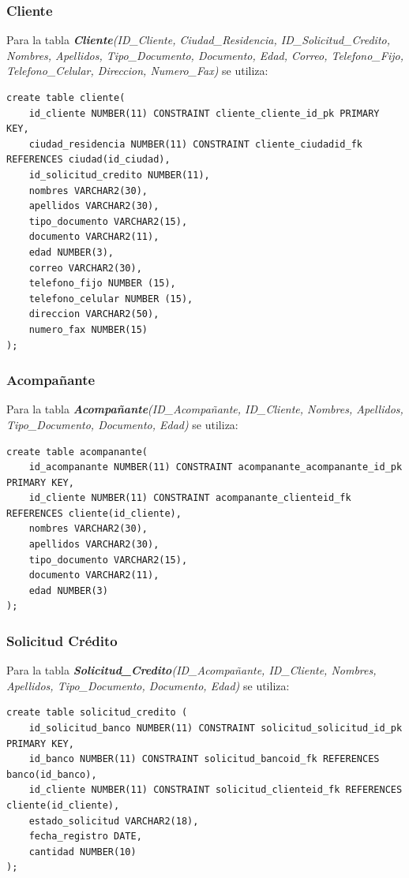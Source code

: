 \documentclass{article}
\begin{document}
\subsubsection{Cliente}

Para la tabla \textit{\textbf{Cliente}(ID\_Cliente, Ciudad\_Residencia, ID\_Solicitud\_Credito, Nombres, Apellidos, Tipo\_Documento, Documento, Edad, Correo, Telefono\_Fijo, Telefono\_Celular, Direccion, Numero\_Fax)} se utiliza:

\begin{lstlisting}
create table cliente(
    id_cliente NUMBER(11) CONSTRAINT cliente_cliente_id_pk PRIMARY KEY,
    ciudad_residencia NUMBER(11) CONSTRAINT cliente_ciudadid_fk REFERENCES ciudad(id_ciudad),
    id_solicitud_credito NUMBER(11),
    nombres VARCHAR2(30),
    apellidos VARCHAR2(30),
    tipo_documento VARCHAR2(15),
    documento VARCHAR2(11),
    edad NUMBER(3),
    correo VARCHAR2(30),
    telefono_fijo NUMBER (15),
    telefono_celular NUMBER (15),
    direccion VARCHAR2(50),
    numero_fax NUMBER(15)
);
\end{lstlisting}

\subsubsection{Acompañante}

Para la tabla \textit{\textbf{Acompañante}(ID\_Acompañante, ID\_Cliente, Nombres, Apellidos, Tipo\_Documento, Documento, Edad)} se utiliza:

\begin{lstlisting}
create table acompanante(
    id_acompanante NUMBER(11) CONSTRAINT acompanante_acompanante_id_pk PRIMARY KEY,
    id_cliente NUMBER(11) CONSTRAINT acompanante_clienteid_fk REFERENCES cliente(id_cliente),
    nombres VARCHAR2(30),
    apellidos VARCHAR2(30),
    tipo_documento VARCHAR2(15),
    documento VARCHAR2(11),
    edad NUMBER(3)
);
\end{lstlisting}


\subsubsection{Solicitud Crédito}

Para la tabla \textit{\textbf{Solicitud\_Credito}(ID\_Acompañante, ID\_Cliente, Nombres, Apellidos, Tipo\_Documento, Documento, Edad)} se utiliza:

\begin{lstlisting}
create table solicitud_credito (
    id_solicitud_banco NUMBER(11) CONSTRAINT solicitud_solicitud_id_pk PRIMARY KEY,
    id_banco NUMBER(11) CONSTRAINT solicitud_bancoid_fk REFERENCES banco(id_banco),
    id_cliente NUMBER(11) CONSTRAINT solicitud_clienteid_fk REFERENCES cliente(id_cliente),
    estado_solicitud VARCHAR2(18),
    fecha_registro DATE,
    cantidad NUMBER(10)
);
\end{lstlisting}
\end{document}
